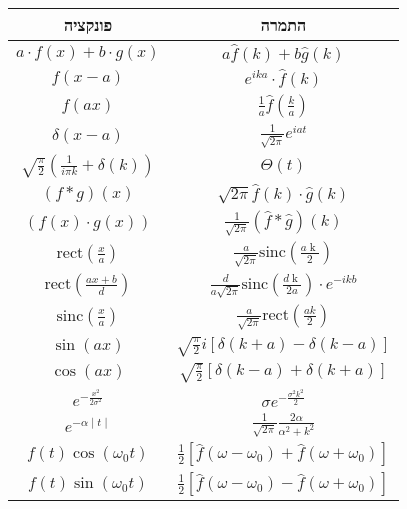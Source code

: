 \documentclass{tstextbook}
\begin{document}
\begin{table}[htbp]
  \centering
  \begin{tabular}{|cc|}
    \hline
    פונקציה & התמרה \\ \hline
    \(a\cdot f(x)+b\cdot g(x)\) & \(a\hat{f}(k)+b\hat{g}(k)\) \\ \hline
    \(f(x-a)\) & \(e^{ika}\cdot \hat{f}(k)\) \\ \hline
    \(f(ax)\) & \(\frac{1}{a}\hat{f}\left( \frac{k}{a} \right)\) \\ \hline
    \(\delta(x-a)\) & \(\frac{1}{\sqrt{2\pi}} e^{iat}\) \\ \hline
    \(\sqrt{\frac{\pi}{2}}\left( \frac{1}{i\pi k}+\delta(k)\right)\) & \(\Theta(t)\) \\ \hline
    \((f*g)(x)\) & \(\sqrt{2\pi }\hat{f}(k)\cdot \hat{g}(k)\) \\ \hline
    \(\left( f(x)\cdot g(x) \right)\) & \(\frac{1}{\sqrt{2\pi}}\left( \hat{f}*\hat{g} \right)(k)\) \\ \hline
    \(\mathrm{rect}\left( \frac{x}{a} \right)\) & \(\frac{a}{\sqrt{2\pi}} \mathrm{sinc}{\left(\frac{a\operatorname{k}}{2}\right)}\) \\ \hline
    \(\mathrm{rect}\left( \frac{ax+b}{d} \right)\) & \(\frac{d}{a\sqrt{2\pi}} \mathrm{sinc}{\left(\frac{d\operatorname{k}}{2a}\right)}\cdot e^{-ikb}\) \\ \hline
    \(\mathrm{sinc}(\frac{x}{a})\) & \(\frac{a}{\sqrt{2\pi }} \mathrm{rect}\left( \frac{ak}{2} \right)\) \\ \hline
    \(\sin(ax)\) & \(\sqrt{ \frac{\pi}{2} }i\left[ \delta(k+a)-\delta(k-a)\right]\) \\ \hline
    \(\cos(ax)\) & \(\sqrt{ \frac{\pi}{2} }\left[ \delta(k-a)+\delta(k+a)\right]\) \\ \hline
    \(e^{-\frac{x^2}{2\sigma^2}}\) & \(\sigma e^{-\frac{\sigma^2k^2}{2}}\) \\ \hline
    \(e^{-\alpha\mid t\mid}\) & \(\frac{1}{\sqrt{2\pi}} \frac{2\alpha}{\alpha^2+k^2}\) \\ \hline
    \(f(t)\cos\left( \omega_{0}t \right)\) & \(\frac{1}{2}\left[ \hat{f}\left( \omega-\omega_{0} \right)+\hat{f}\left( \omega+\omega_{0} \right) \right]\) \\ \hline
    \(f(t)\sin\left( \omega_{0} t\right)\) & \(\frac{1}{2}\left[ \hat{f}\left( \omega-\omega_{0} \right)-\hat{f}\left( \omega+\omega_{0} \right) \right]\) \\ \hline
  \end{tabular}
\end{table}
\end{document}
